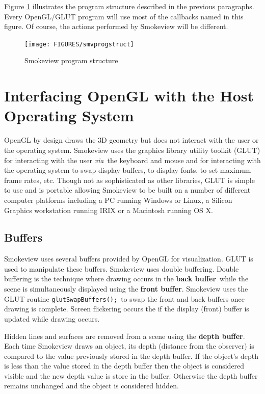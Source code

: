 \documentclass[11pt,twoside]{book}
\begin{document}
Figure \ref{figprogstruct} illustrates the program structure
described in the previous paragraphs.  Every OpenGL/GLUT program
will use most of the callbacks named in this figure.  Of course,
the actions performed by Smokeview will be different.

\begin{figure}
\begin{center}
\texttt{[image: FIGURES/smvprogstruct]}
\end{center}
\caption{Smokeview program structure}
\label{figprogstruct}
\end{figure}

%
%

\chapter{Interfacing OpenGL with the Host Operating System}
\label{openglinterface}
OpenGL by design draws the 3D geometry but
does not interact with the user or the operating system. Smokeview
uses the graphics library utility toolkit (GLUT) for interacting
with the user {\em via}\ the keyboard and mouse and for
interacting with the operating system to swap display buffers, to
display fonts, to set maximum frame rates, etc. Though not as
sophisticated as other libraries, GLUT is simple to use and is
portable allowing Smokeview to be built on a number of different
computer platforms including a PC running Windows or Linux, a
Silicon Graphics workstation running IRIX or a Macintosh running
OS X.

%
%

\section{Buffers} Smokeview uses several buffers provided by
OpenGL for visualization.  GLUT is used to manipulate these
buffers. Smokeview uses double buffering.  Double buffering is the
technique where drawing occurs in the {\bf back buffer}\ while the
scene is simultaneously displayed using the {\bf front buffer}.
Smokeview uses the GLUT routine {\tt glutSwapBuffers();}\ to swap
the front and back buffers once drawing is complete. Screen
flickering occurs the if the display (front) buffer is updated
while drawing occurs.

Hidden lines and surfaces are removed from a scene using the {\bf
depth buffer}.  Each time Smokeview draws an object, its depth
(distance from the observer) is compared to the value previously
stored in the depth buffer.  If the object's depth is less than
the value stored in the depth buffer then the object is considered
visible and the new depth value is store in the buffer. Otherwise
the depth buffer remains unchanged and the object is considered
hidden.
\end{document}

